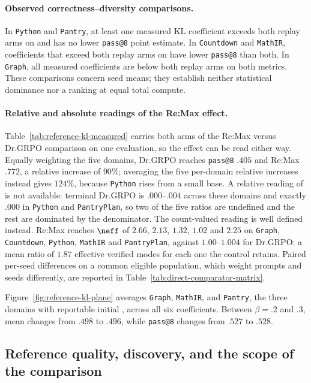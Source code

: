 \paragraph{Observed correctness--diversity comparisons.}
In \texttt{Python} and \texttt{Pantry}, at least one measured KL coefficient exceeds both
replay arms on \pmd{} and has no lower \texttt{pass@8} point estimate.
In \texttt{Countdown} and \texttt{MathIR}, coefficients that exceed both replay arms on
\pmd{} have lower \texttt{pass@8} than both. In \texttt{Graph},
all measured coefficients are below both replay arms on both metrics.
These comparisons concern seed means; they establish neither statistical
dominance nor a ranking at equal total compute.
\paragraph{Relative and absolute readings of the Re:Max effect.}
Table~\ref{tab:reference-kl-measured} carries both arms of the Re:Max versus
Dr.GRPO comparison on one evaluation, so the effect can be read either way.
Equally weighting the five domains, Dr.GRPO reaches \texttt{pass@8} $.405$ and
Re:Max $.772$, a relative increase of $90\%$; averaging the five per-domain
relative increases instead gives $124\%$, because \texttt{Python} rises from a
small base. A relative reading of \pmd{} is not available: terminal Dr.GRPO
\pmd{} is $.000$--$.004$ across these domains and exactly $.000$ in
\texttt{Python} and \texttt{PantryPlan}, so two of the five ratios are
undefined and the rest are dominated by the denominator. The count-valued
reading is well defined instead. Re:Max reaches $\neff$ of $2.66$, $2.13$,
$1.32$, $1.02$ and $2.25$ on \texttt{Graph}, \texttt{Countdown},
\texttt{Python}, \texttt{MathIR} and \texttt{PantryPlan}, against
$1.00$--$1.004$ for Dr.GRPO: a mean ratio of $1.87$ effective verified modes
for each one the control retains. Paired per-seed \pmd{} differences on a
common eligible population, which weight prompts and seeds differently, are
reported in Table~\ref{tab:direct-comparator-matrix}.

Figure~\ref{fig:reference-kl-plane} averages \texttt{Graph}, \texttt{MathIR}, and
\texttt{Pantry}, the three domains with reportable initial \pmd{}, across all
six coefficients. Between $\beta=.2$ and $.3$, mean \pmd{} changes from
$.498$ to $.496$, while \texttt{pass@8} changes from $.527$ to $.528$.

\subsection{Reference quality, discovery, and the scope of the comparison}
\label{app:kl-case}

